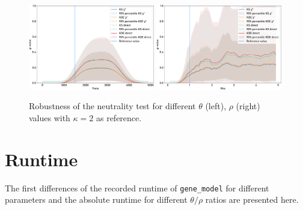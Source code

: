 \begin{figure}[H]
    \centering
    \includegraphics[width=0.49\textwidth]{figures/neutrality_test/gc_2_theta.pdf}
    \includegraphics[width=0.49\textwidth]{figures/neutrality_test/gc_2_rho.pdf}
    \caption[Robustness of the neutrality test for $\kappa = 2$ as reference.]{Robustness of the neutrality test for different $\theta$ (left), $\rho$ (right) values
        with $\kappa = 2$ as reference.}
    \label{app:robust_gc}
\end{figure}
\newpage
\section{Runtime}\label{app:runtime}
The first differences of the recorded runtime of \texttt{gene_model} for different parameters and the absolute runtime for different $\theta / \rho$ ratios are presented here.

